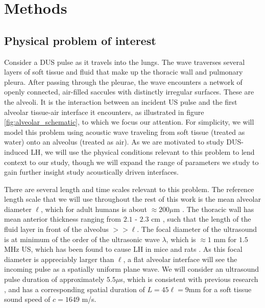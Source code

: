 \documentclass{jfm}%
\begin{document}
\section{Methods}%
\label{sec:methods}%
\subsection{Physical problem of interest}
\label{subsec:physical_problem}
Consider a \ac{DUS} pulse as it travels into the lungs. The wave
traverses several layers of soft tissue and fluid that make up the
thoracic wall and pulmonary pleura. After passing through the pleurae,
the wave encounters a network of openly connected, air-filled saccules
with distinctly irregular surfaces. These are the alveoli. It is the
interaction between an incident \ac{US} pulse and the first alveolar
tissue-air interface it encounters, as illustrated in figure
\ref{fig:alveolar_schematic}, to which we
focus our attention. For simplicity, we will model this problem using
acoustic wave traveling from soft tissue (treated as water) onto an
alveolus (treated as air). As we are motivated to study
\ac{DUS}-induced \ac{LH}, we will use the physical conditions relevant
to this problem to lend context to our study, though we will expand
the range of parameters we study to gain further insight study
acoustically driven interfaces.

There are several length and time scales relevant to this
problem. The reference length scale that we will use throughout the
rest of this work is the mean alveolar diameter $\ell$, which for
adult humans is about $\approx 200 \mu$m \citep{Ochs2004}. The
thoracic wall has mean anterior thickness ranging from $2.1$ - $2.3$
cm \cite{McLean2011}, such that the length of the fluid layer in front
of the alveolus $>>\ell$. The focal diameter of the ultrasound is at
minimum of the order of the ultrasonic wave $\lambda$, which is
$\approx 1$ mm for $1.5$ MHz \ac{US}, which has been found to cause
\ac{LH} in mice and rats \cite{Child1990,Miller2015a}. As this focal diameter is
appreciably larger than $\ell$, a flat alveolar interface will see the
incoming pulse as a spatially uniform plane wave. We will consider an
ultrasound pulse duration of approximately $5.5 \mu$s, which is
consistent with previous research \citep{Child1990}, and has a
corresponding spatial duration of $L=45\ell = 9$mm for a soft tissue sound
speed of $c=1649$ m/s. 
\end{document}
